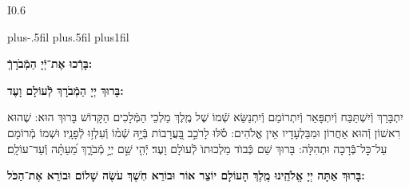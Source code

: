 \documentclass[twoside, openany, parskip=half, 11pt]{book}
\begin{document}
\newcommand{\barachu}{
\begin{wrapfigure}[5]{I}{0.6\textwidth}
\begin{minipage}{0.6\textwidth}
\leftskip=0pt plus-.5fil
\rightskip=0pt plus.5fil
\parfillskip=0pt plus1fil
\begin{large}

\shatz
\begin{Large}\textbf{בָּרְֿכוּ אֶת־יְֿיָ הַמְֿבֹרָךְֿ:}\end{Large}
\end{large}

\vspace{12pt}

\shatzvkahal
\textbf{בָּרוּךְ יְיָ הַמְֿבֹרָךְ לְֿעוֹלָם וָעֶד:}
\end{minipage}
\end{wrapfigure}

\begin{footnotesize}
יִתְבָּרַךְ וְֿיִשְׁתַּבַּח וְֿיִתְפָּאַר וְֿיִתְרוֹמַם וְֿיִתְנַשֵּׂא שְֿׁמוֹ שֶׁל מֶֽלֶךְ מַלְכֵי הַמְּֿלָכִים הַקָּדוֹשׁ בָּרוּךְ הוּא: שֶׁהוּא רִאשׁוֹן וְֿהוּא אַחֲרוֹן וּמִבַּלְעָדָיו אֵין אֱלֹהִים: \source{תהלים סח}סֹ֡לּוּ לָרֹכֵ֣ב בָּ֭עֲרָבוֹת בְּֿיָ֥הּ שְֿׁמ֗וֹ וְֿעִלְז֥וּ לְֿפָנָֽיו׃ וּשְׁמוֹ מְֿרוֹמָם עַל־כׇּל־בְּֿרָכָה וּתְהִלָּה: בָּרוּךְ שֵׁם כְּֿבוֺד מַלְכוּתוֺ לְֿעוֺלָם וָעֶד׃ \source{תהלים קיג}יְֿהִ֤י שֵׁ֣ם יְיָ֣ מְֿבֹרָ֑ךְ מֵ֝עַתָּ֗ה וְֿעַד־עוֹלָֽם׃

\end{footnotesize}
}


\barachu

\textbf{
בָּרוּךְ אַתָּה יְיָ אֱלֹהֵֽינוּ מֶֽלֶךְ הָעוֹלָם יוֹצֵר אוֹר וּבוֹרֵא חֹֽשֶׁךְ עֹשֶׂה שָׁלוֹם וּבוֹרֵא אֶת־הַכֹּל:
}

\newcommand{\hameir}{
\firstword{הַמֵּאִיר}
לָאָֽרֶץ וְֿלַדָּרִים עָלֶֽיהָ בְּֿרַחֲמִים וּבְטוּבוֹ מְֿחַדֵּשׁ בְּֿכׇל־יוֹם תָּמִיד מַעֲשֵׂה בְֿרֵאשִׁית: \source{תהלים קד}מָה־רַבּ֬וּ מַעֲשֶׂ֨יךָ ׀ יְיָ֗ כֻּ֭לָּם בְּֿחׇכְמָ֣ה עָשִׂ֑יתָ מָלְֿאָ֥ה הָ֝אָ֗רֶץ קִנְיָנֶֽךָ׃ הַמֶּֽלֶךְ הַמְֿרוֹמָם לְֿבַדּוֹ מֵאָז הַמְֿשֻׁבָּח וְֿהַמְֿפֹאָר וְֿהַמִּתְנַשֵּׂא מִימוֹת עוֹלָם: אֱלֹהֵי עוֹלָם בְּֿרַחֲמֶיךָ הָרַבִּים רַחֵם עָלֵינוּ אֲדוֹן עֻזֵּֽנוּ צוּר מִשְׂגַּבֵּנוּ מָגֵן יִשְׁעֵֽנוּ מִשְׂגָּב בַּעֲדֵֽנוּ: אֵ֗ל בָּ֗רוּךְ גְּֿ֗דוֹל דֵּ֗עָה הֵ֗כִין וּ֗פָעַל זׇׇׇׇׇָ֗הֳרֵי חַ֗מָּה ט֗וֹב יָ֗צַר כָּ֗בוֹד לִ֗שְׁמוֹ מְֿ֗אוֹרוֹת נָ֗תַן סְֿ֗בִיבוֹת עֻ֗זּוֹ פִּ֗נּוֹת צְֿ֗בָאָיו קְֿ֗דוֹשִׁים ר֗וֹמֲמֵי שַׁ֗דַּי תָּ֗מִיד מְֿסַפְּֿרִים כְּֿבוֹד־אֵל וּקְדֻשָׁתוֹ: תִּתְבָּרַךְ יְיָ אֱלֹהֵֽינוּ עַל־שֶׁבַח מַעֲשֵׂי יָדֶֽיךָ וְֿעַל־מְאֽוֹרֵי אוֹר שֶׁעָשִֽׂיתָ יְֿפָאֲרֽוּךָ סֶּֽלָה:
}

\newcommand{\kadoshkadoshkadosh}{•}
\end{document}
